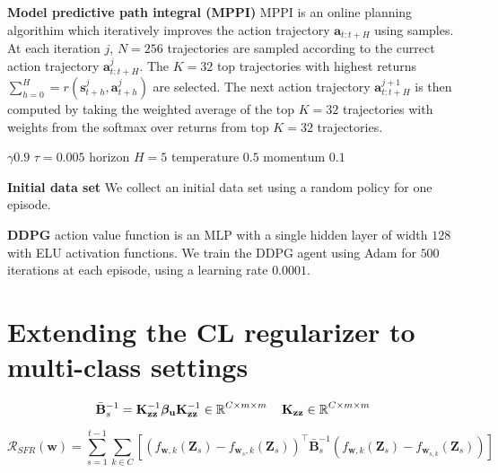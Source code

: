 \documentclass{article}
\newcommand{\state}{\ensuremath{\mathbf{s}}}
\newcommand{\action}{\ensuremath{\mathbf{a}}}
\newcommand{\mathbold}[1]{\bm{#1}}
\newcommand{\mbf}[1]{\mathbf{#1}}
\newcommand{\MB}{\mbf{B}}
\newcommand{\MZ}{\mbf{Z}}
\newcommand{\T}{\top}
\newcommand{\vbeta}[0]{\mathbold{\beta}}
\newcommand{\vu}{\mbf{u}}
\newcommand{\vw}{\mbf{w}}
\newcommand{\MKzz}{\mbf{K}_{\mbf{z}\mbf{z}}}
\begin{document}
\textbf{Model predictive path integral (MPPI)}
MPPI is an online planning algorithim which iteratively improves the action trajectory $\action_{t:t+H}$ using samples.
At each iteration $j$, $N=256$ trajectories are sampled according to the currect action trajectory $\action^{j}_{t:t+H}$.
The $K=32$ top trajectories with highest returns $\sum_{h=0}^{H} = r(\state^{j}_{t+h}, \action^{j}_{t+h})$ are selected.
The next action trajectory $\action^{j+1}_{t:t+H}$ is then computed by taking the weighted average of the top $K=32$ trajectories
with weights from the softmax over returns from top $K=32$ trajectories.

$\gamma 0.9$
$\tau=0.005$
horizon $H=5$
temperature $0.5$
momentum $0.1$

\textbf{Initial data set}
We collect an initial data set using a random policy for one episode.

\textbf{DDPG}
action value function is an MLP with a single hidden layer of width $128$ with ELU activation functions.
We train the DDPG agent using Adam for $500$ iterations at each episode, using a learning rate $0.0001$.


\section{Extending the CL regularizer to multi-class settings}
\begin{equation}
	\bar{\MB}^{-1}_s = \MKzz^{-1} \vbeta_\vu \MKzz^{-1} \in \R^{C \times m \times m} \quad \MKzz \in \R^{C \times m \times m} 
\end{equation}

\begin{equation}
	\mathcal{R_\textit{SFR}}(\mathbf{w}) = \sum_{s=1}^{t-1}	\sum_{k \in 	C}\left[\left(f_{\vw, k}(\MZ_{s}) - f_{\vw_{s}, k}(\MZ_s) \right)^\T \bar{\MB}^{-1}_{s} \left(f_{\vw, k}(\MZ_{s}) - f_{\vw_{s, k}}(\MZ_s) \right) \right] 
\end{equation}
\end{document}
